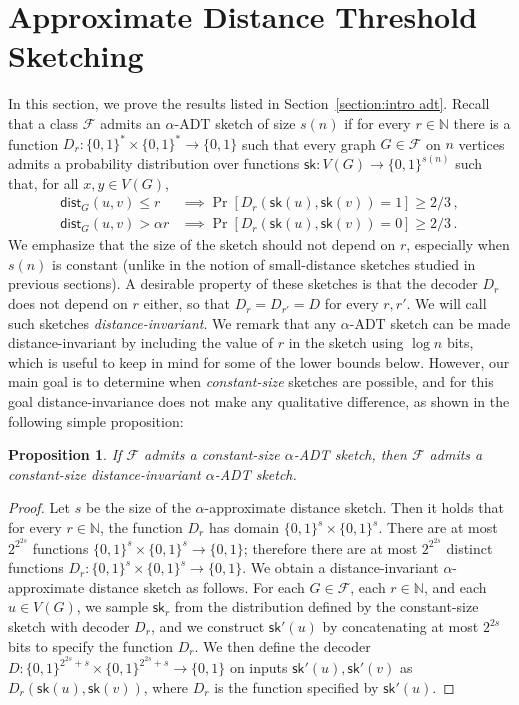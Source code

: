 \documentclass[11pt]{article}
\newtheorem{proposition}[thm]{Proposition}
\theoremstyle{definition}
\newcommand{\zo}{\{0,1\}}
\newcommand{\sk}{\mathsf{sk}}
\renewcommand{\leq}{\leqslant}
\renewcommand{\geq}{\geqslant}
\def\F {{\mathcal F}}
\def\bN{{\mathbb N}}
\def\sk {\mathsf{sk}}
\newcommand{\dist}{\mathsf{dist}}
\begin{document}
\section{Approximate Distance Threshold Sketching}
\label{section:adt}

In this section, we prove the results listed in Section~\ref{section:intro adt}.  Recall that a
class $\F$ admits an $\alpha$-ADT sketch of size $s(n)$ if for every $r \in \bN$ there is a function
$D_r : \zo^* \times \zo^* \to \zo$ such that every graph $G \in \F$ on $n$ vertices admits a probability
distribution over functions $\sk : V(G) \to \zo^{s(n)}$ such that, for all $x,y \in V(G)$,
\begin{align*}
  \dist_G(u,v) \leq r &\implies \Pr[ D_r(\sk(u), \sk(v)) = 1 ] \geq 2/3 \,,\\
  \dist_G(u,v) > \alpha r &\implies \Pr[ D_r(\sk(u), \sk(v)) = 0 ] \geq 2/3 \,.
\end{align*}
\noindent
We emphasize that the size of the sketch should not depend on $r$, especially when $s(n)$ is constant (unlike in
the notion of small-distance sketches studied in previous sections).  A desirable property of these
sketches is that the decoder $D_r$ does not depend on $r$ either, so that $D_r = D_{r'} = D$ for
every $r,r'$.  We will call such sketches \emph{distance-invariant}. We remark that any $\alpha$-ADT
sketch can be made distance-invariant by including the value of $r$ in the sketch using $\log n$
bits, which is useful to keep in mind for some of the lower bounds below. However, our main goal is
to determine when \emph{constant-size} sketches are possible, and for this goal distance-invariance
does not make any qualitative difference, as shown in the following simple proposition:

\begin{proposition}
\label{prop:r-invariant equivalence}
If $\F$ admits a constant-size $\alpha$-ADT sketch, then $\F$ admits a constant-size
distance-invariant $\alpha$-ADT sketch.
\end{proposition}
\begin{proof}
Let $s$ be the size of the $\alpha$-approximate distance sketch. Then it holds that for every
$r \in \bN$, the function $D_r$ has domain $\zo^s \times \zo^s$. There are at most $2^{2^{2s}}$
functions $\zo^s \times \zo^s \to \zo$; therefore there are at most $2^{2^{2s}}$ distinct functions
$D_r : \zo^s \times \zo^s \to \zo$. We obtain a distance-invariant $\alpha$-approximate distance
sketch as follows. For each $G \in \F$, each $r \in \bN$, and each $u \in V(G)$, we sample $\sk_r$
from the distribution defined by the constant-size sketch with decoder $D_r$, and we construct
$\sk'(u)$ by concatenating at most $2^{2s}$ bits to specify the function $D_r$. We then define the
decoder $D : \zo^{2^{2s}+s} \times \zo^{2^{2s}+s} \to \zo$ on inputs $\sk'(u), \sk'(v)$ as
$D_r(\sk(u), \sk(v))$, where $D_r$ is the function specified by $\sk'(u)$.
\end{proof}
\end{document}
